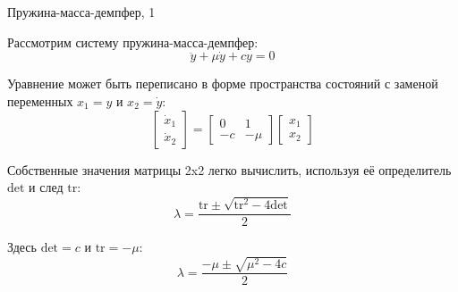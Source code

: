 \documentclass{beamer}
\begin{document}
\begin{frame}{Пружина-масса-демпфер, 1}
	\begin{flushleft}
		
		Рассмотрим систему пружина-масса-демпфер:
		\begin{equation}
			\ddot y + \mu \dot y + c y = 0
		\end{equation}
		
		Уравнение может быть переписано в форме пространства состояний с заменой переменных $x_1 = y$ и $x_2 = \dot y$:
		\begin{equation}
			\begin{bmatrix}
				\dot x_1 \\ \dot x_2
			\end{bmatrix} 
			= 
			\begin{bmatrix}
				0 & 1 \\ - c & -\mu
			\end{bmatrix}
			\begin{bmatrix}
				x_1 \\ x_2
			\end{bmatrix}
		\end{equation}
		
		
		Собственные значения матрицы 2x2 легко вычислить, используя её определитель $\text{det}$ и след $\text{tr}$:
		\begin{equation}
			\lambda = \frac{\text{tr} \pm \sqrt{\text{tr}^2 - 4 \text{det}}}{2} 
		\end{equation}
		
		Здесь $\text{det} = c$ и $\text{tr} = -\mu$:
		\begin{equation}
			\lambda = \frac{-\mu \pm \sqrt{\mu^2 - 4 c}}{2} 
		\end{equation}
		
	\end{flushleft}
\end{frame}
\end{document}
